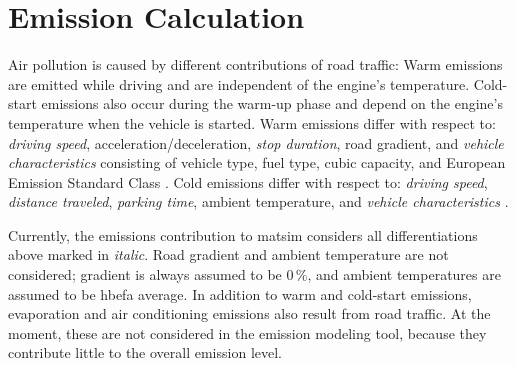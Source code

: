 \section{Emission Calculation}
\label{ch:emissions:overview}
%
Air pollution is caused by different contributions of road traffic:
%
Warm emissions are emitted while driving and are independent of the engine's temperature.
%
Cold-start emissions also occur during the warm-up phase and depend on the engine's temperature when the vehicle is started.
%
Warm emissions differ with respect to: \emph{driving speed}, acceleration/deceleration, \emph{stop duration}, road gradient, and \emph{vehicle characteristics} consisting of vehicle type, fuel type, cubic capacity, and European Emission Standard Class \citep{AndreRapone_Atmos_2009}.
%
Cold emissions differ with respect to: \emph{driving speed}, \emph{distance traveled}, \emph{parking time}, ambient temperature, and \emph{vehicle characteristics} \citep{WeilenmannEtAl_Atmos_2009}.

Currently, the emissions contribution to \gls{matsim} considers all differentiations above marked in \emph{italic}. Road gradient and ambient temperature are not considered; gradient is always assumed to be 0\,\%, and ambient temperatures are assumed to be \gls{hbefa} average.
%
In addition to warm and cold-start emissions, evaporation and air conditioning emissions also result from road traffic. At the moment, these are not considered in the emission modeling tool, because they  contribute little to the overall emission level.


